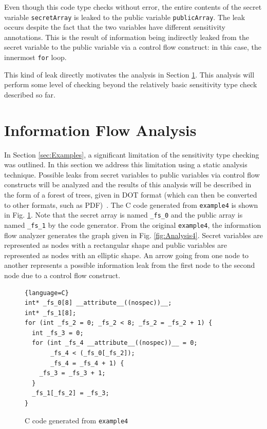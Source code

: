 \documentclass[10pt, conference]{IEEEtran}
\newcommand{\ttt}{\texttt}
\begin{document}
\noindent Even though this code type checks without error, the entire contents of the secret variable \ttt{secretArray} is leaked
to the public variable \ttt{publicArray}. The leak occurs despite the fact that the two variables have different
sensitivity annotations. This is the
result of information being indirectly leaked from the secret variable to the
public variable via a control flow construct: in this case, the innermost \ttt{for} loop.

This kind of leak directly motivates the analysis in Section \ref{sec:Analysis}. This analysis will perform
some level of checking beyond the relatively basic sensitivity type check described so far.

\section{Information Flow Analysis}
\label{sec:Analysis}

In Section \ref{sec:Examples}, a significant limitation of the sensitivity type checking
was outlined. In this section we address this limitation using a static analysis technique.
Possible leaks from secret variables to public variables via control flow constructs will
be analyzed and the results of this analysis will be described in the form of
a forest of trees, given in DOT format (which can then be converted to other formats,
such as PDF)~\cite{DOT}. The C code generated from \ttt{example4} is shown in Fig. \ref{fig:GenC4}.
Note that the secret array is named \verb|_fs_0| and the public array is named \verb|_fs_1| by the
code generator. From the original \ttt{example4}, the information flow analyzer generates the
graph given in Fig. \ref{fig:Analysis4}. Secret variables are represented as nodes with
a rectangular shape and public variables are represented as nodes with an elliptic shape. An
arrow going from one node to another represents a possible information leak from the first
node to the second node due to a control flow construct.

\begin{figure}[h]
\begin{lstlisting}{language=C}
int* _fs_0[8] __attribute__((nospec))__;
int* _fs_1[8];
for (int _fs_2 = 0; _fs_2 < 8; _fs_2 = _fs_2 + 1) {
  int _fs_3 = 0;
  for (int _fs_4 __attribute__((nospec))__ = 0;
       _fs_4 < (_fs_0[_fs_2]);
       _fs_4 = _fs_4 + 1) {
    _fs_3 = _fs_3 + 1;
  }
  _fs_1[_fs_2] = _fs_3;
}
\end{lstlisting}
\caption{C code generated from \ttt{example4}}
\label{fig:GenC4}
\end{figure}
\end{document}

